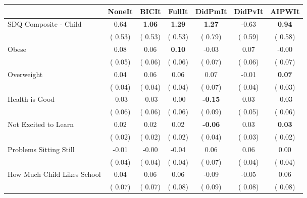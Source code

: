 \begin{tabular}{l c c c c c c}
\toprule
 & NoneIt & BICIt & FullIt & DidPmIt & DidPvIt & AIPWIt \\
\midrule
SDQ Composite - Child &      0.64 & \textbf{      1.06 } & \textbf{      1.29 } & \textbf{      1.27 } &     -0.63 & \textbf{     0.94} \\
& (     0.53) & (     0.53) & (     0.53) & (     0.79) & (     0.59) & (     0.58) \\
Obese &      0.08 &      0.06 & \textbf{      0.10 } &     -0.03 &      0.07 &     -0.00 \\
& (     0.05) & (     0.06) & (     0.06) & (     0.07) & (     0.06) & (     0.07) \\
Overweight &      0.04 &      0.06 &      0.06 &      0.07 &     -0.01 & \textbf{     0.07} \\
& (     0.04) & (     0.04) & (     0.04) & (     0.07) & (     0.04) & (     0.03) \\
Health is Good &     -0.03 &     -0.03 &     -0.00 & \textbf{     -0.15 } &      0.03 &     -0.03 \\
& (     0.06) & (     0.06) & (     0.06) & (     0.09) & (     0.05) & (     0.06) \\
Not Excited to Learn &      0.02 &      0.02 &      0.02 & \textbf{     -0.06 } &      0.03 & \textbf{     0.03} \\
& (     0.02) & (     0.02) & (     0.02) & (     0.04) & (     0.03) & (     0.02) \\
Problems Sitting Still &     -0.01 &     -0.00 &     -0.04 &      0.06 &      0.06 &      0.00 \\
& (     0.04) & (     0.04) & (     0.04) & (     0.07) & (     0.04) & (     0.04) \\
How Much Child Likes School &      0.04 &      0.06 &      0.06 &     -0.09 &     -0.05 &      0.06 \\
& (     0.07) & (     0.07) & (     0.08) & (     0.09) & (     0.08) & (     0.08) \\
\bottomrule
\end{tabular}
